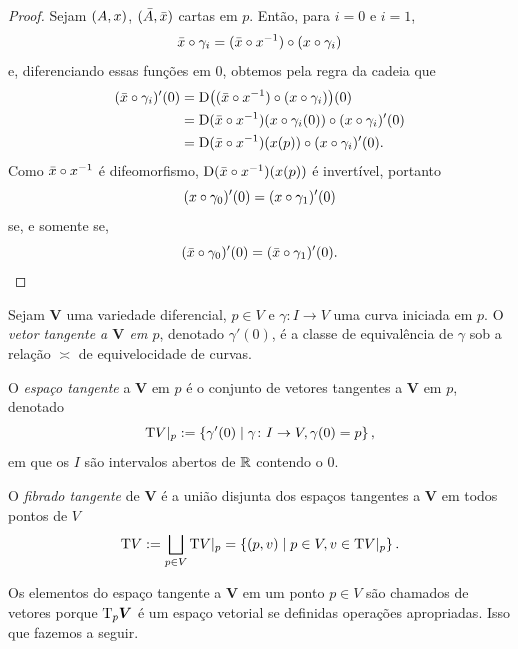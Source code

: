\begin{proof}
Sejam $(A,x)$, $(\bar A,\bar {x})$ cartas em $p$. Então, para $i=0$ e $i=1$,
	\begin{equation*}
	\bar{x} \circ \gamma_i = (\bar{x} \circ x^{-1}) \circ (x \circ \gamma_i)
	\end{equation*}
e, diferenciando essas funções em $0$, obtemos pela regra da cadeia que
	\begin{align*}
	(\bar{x} \circ \gamma_i)'(0) &= \mathrm{D} \big( (\bar{x} \circ x^{-1}) \circ (x \circ \gamma_i) \big)(0) \\
	&= \mathrm{D}(\bar{x} \circ x^{-1})(x \circ \gamma_i(0)) \circ (x \circ \gamma_i)'(0) \\
	&=  \mathrm{D}(\bar{x} \circ x^{-1})(x(p)) \circ (x \circ \gamma_i)'(0).
	\end{align*}
Como $\bar{x} \circ x^{-1}$ é difeomorfismo, $\mathrm{D}(\bar{x} \circ x^{-1})(x(p))$ é invertível, portanto
	\begin{equation*}
	(x \circ \gamma_0)'(0) = (x \circ \gamma_1)'(0)
	\end{equation*}
se, e somente se,
	\begin{equation*}
	(\bar{x} \circ \gamma_0)'(0) = (\bar{x} \circ \gamma_1)'(0).
	\end{equation*}
\end{proof}

\begin{definition}
Sejam $\bm V$ uma variedade diferencial, $p \in V$ e $\gamma: I \to V$ uma curva iniciada em $p$. O \emph{vetor tangente a $\bm V$ em $p$}, denotado $\gamma'(0)$, é a classe de equivalência de $\gamma$ sob a relação $\asymp$ de equivelocidade de curvas.

O \emph{espaço tangente} a $\bm V$ em $p$ é o conjunto de vetores tangentes a $\bm V$ em $p$, denotado
	\begin{equation*}
	\mathrm{T} V|_p := \left\{ \gamma'(0) \;\middle\vert\; \gamma\colon I \to V, \gamma(0)=p \right\},
	\end{equation*}
em que os $I$ são intervalos abertos de $\mathbb{R}$ contendo o $0$.

O \emph{fibrado tangente} de $\bm V$ é a união disjunta dos espaços tangentes a $\bm V$ em todos pontos de $V$
	\begin{equation*}
	\mathrm{T} V := \bigsqcup_{p  \in V} \mathrm{T} V|_p = \left\{ (p,v) \;\middle\vert\; p \in V,v \in \mathrm{T} V|_p \right\}.
	\end{equation*}
\end{definition}

Os elementos do espaço tangente a $\bm V$ em um ponto $p \in V$ são chamados de vetores porque $\mathrm{T}_p \bm V$ é um espaço vetorial se definidas operações apropriadas. Isso que fazemos a seguir.

